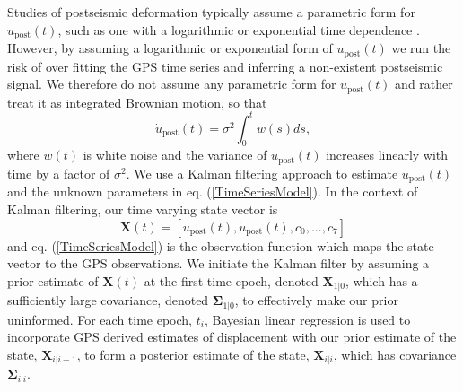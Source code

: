 \documentclass[1p]{elsarticle}
\begin{document}
Studies of postseismic deformation typically assume a parametric form for $u_\mathrm{post}(t)$, such as one with a logarithmic or exponential time dependence \citep[e.g.][]{Savage2005a}.  However, by assuming a logarithmic or exponential form of $u_\mathrm{post}(t)$ we run the risk of over fitting the GPS time series and inferring a non-existent postseismic signal. We therefore do not assume any parametric form for $u_\mathrm{post}(t)$ and rather treat it as integrated Brownian motion, so that 
\begin{equation}
    \dot{u}_\mathrm{post}(t) = \sigma^2\int_0^t w(s) ds,
\end{equation}    
where $w(t)$ is white noise and the variance of $\dot{u}_\mathrm{post}(t)$ increases linearly with time by a factor of $\sigma^2$. We use a Kalman filtering approach to estimate $u_\mathrm{post}(t)$ and the unknown parameters in eq. (\ref{TimeSeriesModel}).  In the context of Kalman filtering, our time varying state vector is
\begin{equation}
    \mathbf{X}(t) = [u_\mathrm{post}(t),\dot u_\mathrm{post}(t), c_0, ..., c_7]
\end{equation}
and eq. (\ref{TimeSeriesModel}) is the observation function which maps the state vector to the GPS observations. We initiate the Kalman filter by assuming a prior estimate of $\mathbf{X}(t)$ at the first time epoch, denoted $\mathbf{X}_{1|0}$, which has a sufficiently large covariance, denoted $\mathbf{\Sigma}_{1|0}$, to effectively make our prior uninformed.  For each time epoch, $t_i$, Bayesian linear regression is used to incorporate GPS derived estimates of displacement with our prior estimate of the state, $\mathbf{X}_{i|i-1}$, to form a posterior estimate of the state, $\mathbf{X}_{i|i}$, which has covariance $\mathbf{\Sigma}_{i|i}$.  
\end{document}
